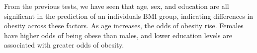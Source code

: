 \documentclass[
  letterpaper,
  DIV=11,
  numbers=noendperiod]{scrartcl}
\begin{document}
From the previous tests, we have seen that age, sex, and education are
all significant in the prediction of an individuals BMI group,
indicating differences in obesity across these factors. As age
increases, the odds of obesity rise. Females have higher odds of being
obese than males, and lower education levels are associated with greater
odds of obesity.
\end{document}
